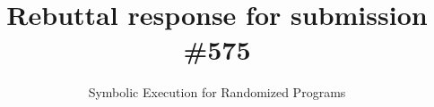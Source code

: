 \documentclass[acmsmall,review,anonymous]{acmart}
\begin{document}
\title{Rebuttal response for submission \#575}         %
\subtitle{Symbolic Execution for Randomized Programs}

\maketitle







\end{document}
